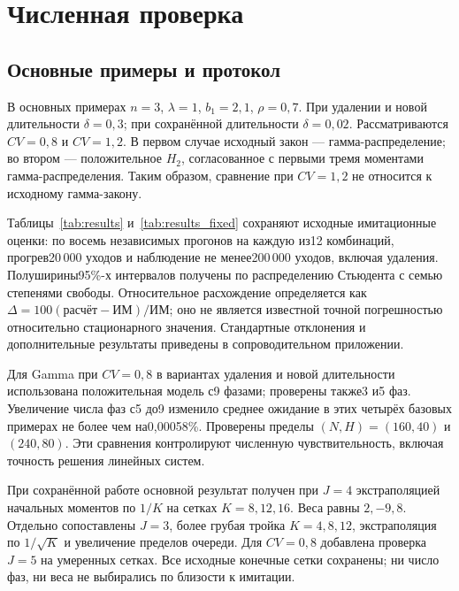 \section{Численная проверка}\label{sec:results}
\subsection{Основные примеры и протокол}
В основных примерах \(n=3\), \(\lambda=1\), \(b_1=2{,}1\), \(\rho=0{,}7\). При удалении и новой длительности \(\delta=0{,}3\); при сохранённой длительности \(\delta=0{,}02\). Рассматриваются \(CV=0{,}8\) и \(CV=1{,}2\). В первом случае исходный закон --- гамма-распределение; во втором --- положительное \(H_2\), согласованное с первыми тремя моментами гамма-распределения. Таким образом, сравнение при \(CV=1{,}2\) не относится к исходному гамма-закону.

Таблицы~\ref{tab:results} и~\ref{tab:results_fixed} сохраняют исходные имитационные оценки: по восемь независимых прогонов на каждую из12 комбинаций, прогрев20\,000 уходов и наблюдение не менее200\,000 уходов, включая удаления. Полуширины95\%-х интервалов получены по распределению Стьюдента с семью степенями свободы. Относительное расхождение определяется как \(\Delta=100(\text{расчёт}-\text{ИМ})/\text{ИМ}\); оно не является известной точной погрешностью относительно стационарного значения. Стандартные отклонения и дополнительные результаты приведены в сопроводительном приложении.

Для Gamma при \(CV=0{,}8\) в вариантах удаления и новой длительности использована положительная модель с9 фазами; проверены также3 и5 фаз. Увеличение числа фаз с5 до9 изменило среднее ожидание в этих четырёх базовых примерах не более чем на0{,}00058\%. Проверены пределы \((N,H)=(160,40)\) и \((240,80)\). Эти сравнения контролируют численную чувствительность, включая точность решения линейных систем.

При сохранённой работе основной результат получен при \(J=4\) экстраполяцией начальных моментов по \(1/K\) на сетках \(K=8,12,16\). Веса равны \(2,-9,8\). Отдельно сопоставлены \(J=3\), более грубая тройка \(K=4,8,12\), экстраполяция по \(1/\sqrt K\) и увеличение пределов очереди. Для \(CV=0{,}8\) добавлена проверка \(J=5\) на умеренных сетках. Все исходные конечные сетки сохранены; ни число фаз, ни веса не выбирались по близости к имитации.


